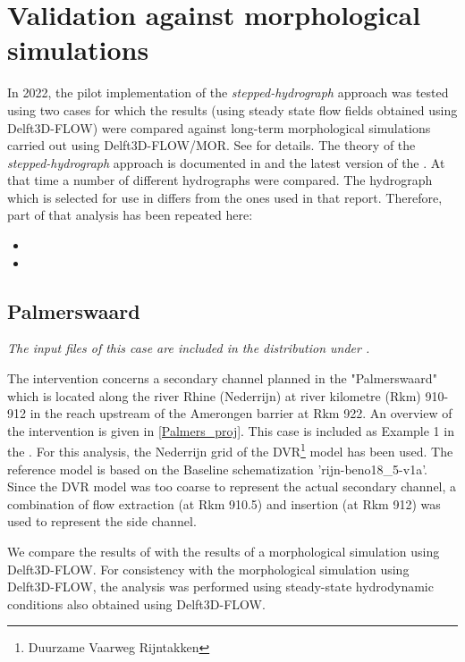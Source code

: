 \chapter{Validation against morphological simulations} \label{Chp:Morphology}

In 2022, the pilot implementation of the \emph{stepped-hydrograph} approach was tested using two cases for which the \dfastmi results (using steady state flow fields obtained using Delft3D-FLOW) were compared against long-term morphological simulations carried out using Delft3D-FLOW/MOR.
See \citet{GiriJagers2022} for details.
The theory of the \emph{stepped-hydrograph} approach is documented in \citet{JagersGiri2022} and the latest version of the \citet{um}.
At that time a number of different hydrographs were compared.
The hydrograph which is selected for use in  differs from the ones used in that report.
Therefore, part of that analysis has been repeated here:

\begin{itemize}
\item {}
\item {}
\end{itemize}

\section{Palmerswaard} \label{Sec:Palmerswaard}

\emph{The input files of this case are included in the distribution under .}

The intervention concerns a secondary channel planned in the "Palmerswaard" which is located along the river Rhine (Nederrijn) at river kilometre (Rkm) 910-912 in the reach upstream of the Amerongen barrier at Rkm 922.
An overview of the intervention is given in \autoref{Palmers_proj}.
This case is included as Example 1 in the \citet{um}.
For this analysis, the Nederrijn grid of the DVR\footnote{Duurzame Vaarweg Rijntakken} model has been used.
The reference model is based on the Baseline schematization 'rijn-beno18\_5-v1a'.
Since the DVR model was too coarse to represent the actual secondary channel, a combination of flow extraction (at Rkm 910.5) and insertion (at Rkm 912) was used to represent the side channel.

We compare the results of \dfmi with the results of a morphological simulation using Delft3D-FLOW.
For consistency with the morphological simulation using Delft3D-FLOW, the \dfmi analysis was performed using steady-state hydrodynamic conditions also obtained using Delft3D-FLOW.


